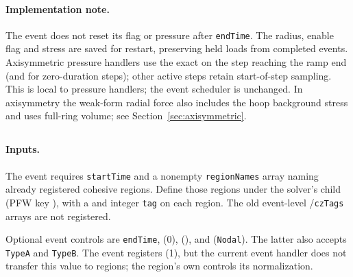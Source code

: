 \paragraph{Implementation note.}
The event does not reset its flag or pressure after \texttt{endTime}. The radius, enable flag and stress are saved for restart, preserving held loads from completed events. Axisymmetric pressure handlers use the exact  on the step reaching the ramp end (and for zero-duration steps); other active steps retain start-of-step sampling. This is local to pressure handlers; the event scheduler is unchanged. In axisymmetry the weak-form radial force also includes the hoop background stress and uses full-ring volume; see Section~\ref{sec:axisymmetric}.

\subsection{}
\label{sec:event-cohesivezone}
\label{subsec:event-cohesive-zone}

\paragraph{Inputs.}
The event requires \texttt{startTime} and a nonempty \texttt{regionNames} array naming already registered cohesive regions. Define those regions under the solver's  child (PFW key ), with a  and integer \texttt{tag} on each region. The old event-level /\texttt{czTags} arrays are not registered.

Optional event controls are \texttt{endTime},  (0),  (), and  (\texttt{Nodal}). The latter also accepts \texttt{TypeA} and \texttt{TypeB}. The event registers  (1), but the current event handler does not transfer this value to regions; the region's own  controls its normalization.

